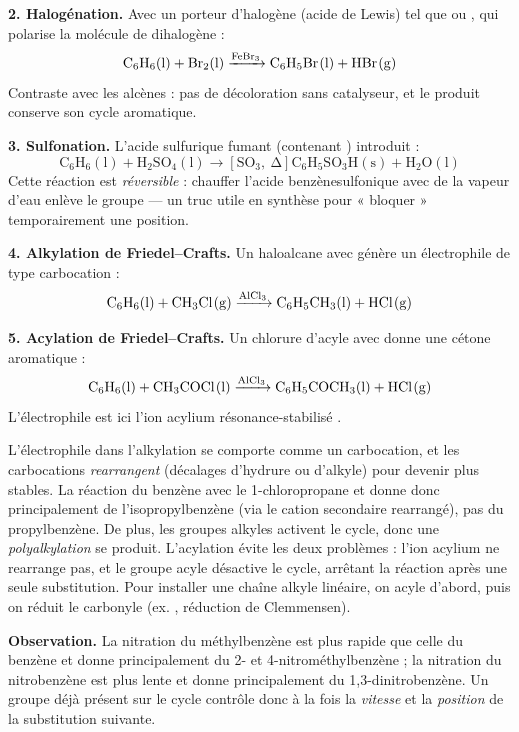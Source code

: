 \documentclass[11pt]{article}
\newcommand{\cle}[1]{{\popxbold\color{popdark}#1}}
\newcounter{popsec}
\newcounter{popsub}
\newcommand{\courssub}[1]{%
  \stepcounter{popsub}%
  \par\vspace{9pt}\noindent{\popxbold\fontsize{11.5}{13}\selectfont\color{popink}{\color{poporange}\thepopsec.\thepopsub}\hspace{6pt}#1}\par\nopagebreak\vspace{4pt}
}
\begin{document}
\textbf{2. Halogénation.} Avec un porteur d'halogène (acide de Lewis) tel que  ou , qui polarise la molécule de dihalogène :
\[ \ce{C6H6(l) + Br2(l) ->[FeBr3] C6H5Br(l) + HBr(g)} \]
Contraste avec les alcènes : pas de décoloration sans catalyseur, et le produit conserve son cycle aromatique.

\textbf{3. Sulfonation.} L'acide sulfurique fumant (contenant ) introduit  :
\[ \ensuremath{\mathrm{C_{6}H_{6}(l) + H_{2}SO_{4}(l) \rightarrow [SO_{3},\ \Delta] C_{6}H_{5}SO_{3}H(s) + H_{2}O(l)}} \]
Cette réaction est \emph{réversible} : chauffer l'acide benzènesulfonique avec de la vapeur d'eau enlève le groupe — un truc utile en synthèse pour « bloquer » temporairement une position.

\textbf{4. Alkylation de Friedel–Crafts.} Un haloalcane avec  génère un électrophile de type carbocation :
\[ \ce{C6H6(l) + CH3Cl(g) ->[AlCl3] C6H5CH3(l) + HCl(g)} \]

\textbf{5. Acylation de Friedel–Crafts.} Un chlorure d'acyle avec  donne une cétone aromatique :
\[ \ce{C6H6(l) + CH3COCl(l) ->[AlCl3] C6H5COCH3(l) + HCl(g)} \]
L'électrophile est ici l'ion acylium résonance-stabilisé .

\begin{attention}
L'électrophile dans l'alkylation se comporte comme un carbocation, et les carbocations \emph{rearrangent} (décalages d'hydrure ou d'alkyle) pour devenir plus stables. La réaction du benzène avec le 1-chloropropane et  donne donc principalement de l'\cle{isopropylbenzène} (via le cation secondaire rearrangé), pas du propylbenzène. De plus, les groupes alkyles activent le cycle, donc une \emph{polyalkylation} se produit. L'\cle{acylation} évite les deux problèmes : l'ion acylium ne rearrange pas, et le groupe acyle désactive le cycle, arrêtant la réaction après une seule substitution. Pour installer une chaîne alkyle linéaire, on acyle d'abord, puis on réduit le carbonyle (ex. , réduction de Clemmensen).
\end{attention}

\courssub{Effets directeurs des substituants}

\textbf{Observation.} La nitration du méthylbenzène est plus rapide que celle du benzène et donne principalement du 2- et 4-nitrométhylbenzène ; la nitration du nitrobenzène est plus lente et donne principalement du 1,3-dinitrobenzène. Un groupe déjà présent sur le cycle contrôle donc à la fois la \emph{vitesse} et la \emph{position} de la substitution suivante.
\end{document}
